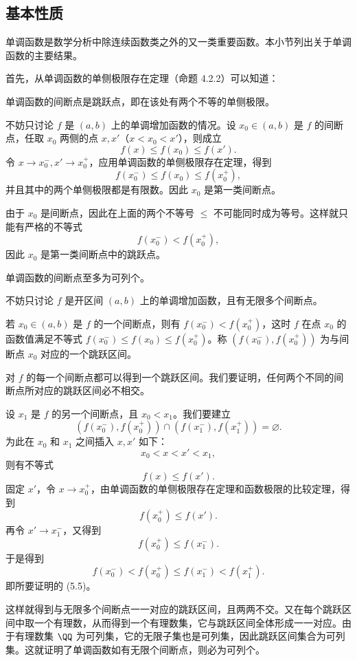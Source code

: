 \subsection{基本性质}

单调函数是数学分析中除连续函数类之外的又一类重要函数。本小节列出关于单调函数的主要结果。

首先，从单调函数的单侧极限存在定理（命题 4.2.2）可以知道：

\begin{xproposition}[5.5.1]
单调函数的间断点是跳跃点，即在该处有两个不等的单侧极限。
\end{xproposition}
\begin{xproof}
不妨只讨论 $f$ 是 $(a,b)$ 上的单调增加函数的情况。设 $x_0\in(a,b)$ 是 $f$ 的间断点，任取 $x_0$ 两侧的点 $x,x'$（$x<x_0<x'$），则成立
\begin{equation}
  f(x)\le f(x_0)\le f(x').
  \tag{5.4}
  \label{eq:5.4}
\end{equation}
令 $x\to x_0^-,x'\to x_0^+$，应用单调函数的单侧极限存在定理，得到
\[
  f(x_0^-)\le f(x_0)\le f(x_0^+),
\]
并且其中的两个单侧极限都是有限数。因此 $x_0$ 是第一类间断点。

由于 $x_0$ 是间断点，因此在上面的两个不等号 $\le$ 不可能同时成为等号。这样就只能有严格的不等式
\[
  f(x_0^-)<f(x_0^+),
\]
因此 $x_0$ 是第一类间断点中的跳跃点。
\end{xproof}

\begin{xproposition}[5.5.2]
单调函数的间断点至多为可列个。
\end{xproposition}
\begin{xproof}
不妨只讨论 $f$ 是开区间 $(a,b)$ 上的单调增加函数，且有无限多个间断点。

若 $x_0\in(a,b)$ 是 $f$ 的一个间断点，则有 $f(x_0^-)<f(x_0^+)$，这时 $f$ 在点 $x_0$ 的函数值满足不等式 $f(x_0^-)\le f(x_0)\le f(x_0^+)$。称 $(f(x_0^-),f(x_0^+))$ 为与间断点 $x_0$ 对应的一个跳跃区间。

对 $f$ 的每一个间断点都可以得到一个跳跃区间。我们要证明，任何两个不同的间断点所对应的跳跃区间必不相交。

设 $x_1$ 是 $f$ 的另一个间断点，且 $x_0<x_1$。我们要建立
\begin{equation}
  (f(x_0^-),f(x_0^+))\cap(f(x_1^-),f(x_1^+))=\varnothing.
  \tag{5.5}
  \label{eq:5.5}
\end{equation}
为此在 $x_0$ 和 $x_1$ 之间插入 $x,x'$ 如下：
\[
  x_0<x<x'<x_1,
\]
则有不等式
\[
  f(x)\le f(x').
\]
固定 $x'$，令 $x\to x_0^+$，由单调函数的单侧极限存在定理和函数极限的比较定理，得到
\[
  f(x_0^+)\le f(x').
\]
再令 $x'\to x_1^-$，又得到
\[
  f(x_0^+)\le f(x_1^-).
\]
于是得到
\[
  f(x_0^-)<f(x_0^+)\le f(x_1^-)<f(x_1^+).
\]
即所要证明的 (5.5)。

这样就得到与无限多个间断点一一对应的跳跃区间，且两两不交。又在每个跳跃区间中取一个有理数，从而得到一个有理数集，它与跳跃区间全体形成一一对应。由于有理数集 $\QQ$ 为可列集，它的无限子集也是可列集，因此跳跃区间集合为可列集。这就证明了单调函数如有无限个间断点，则必为可列个。
\end{xproof}

